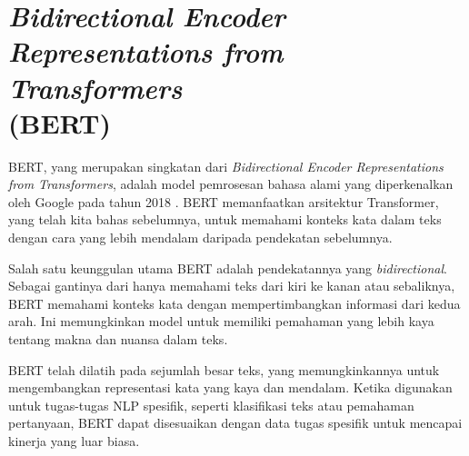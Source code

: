 \section{\textit{Bidirectional Encoder Representations from Transformers} \\ (BERT)}

BERT, yang merupakan singkatan dari \textit{Bidirectional Encoder Representations from Transformers}, adalah model pemrosesan bahasa alami yang diperkenalkan oleh Google pada tahun 2018 \parencite{bert}. BERT memanfaatkan arsitektur Transformer, yang telah kita bahas sebelumnya, untuk memahami konteks kata dalam teks dengan cara yang lebih mendalam daripada pendekatan sebelumnya.

Salah satu keunggulan utama BERT adalah pendekatannya yang \textit{bidirectional}. Sebagai gantinya dari hanya memahami teks dari kiri ke kanan atau sebaliknya, BERT memahami konteks kata dengan mempertimbangkan informasi dari kedua arah. Ini memungkinkan model untuk memiliki pemahaman yang lebih kaya tentang makna dan nuansa dalam teks.

BERT telah dilatih pada sejumlah besar teks, yang memungkinkannya untuk mengembangkan representasi kata yang kaya dan mendalam. Ketika digunakan untuk tugas-tugas NLP spesifik, seperti klasifikasi teks atau pemahaman pertanyaan, BERT dapat disesuaikan dengan data tugas spesifik untuk mencapai kinerja yang luar biasa.
